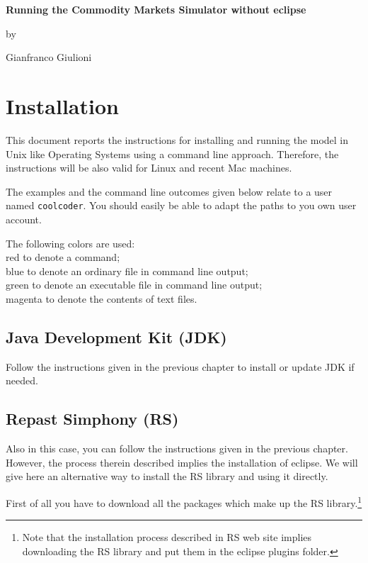 \documentclass{article}
\begin{document}
\begin{center}
	{\bf
	Running the Commodity Markets Simulator without eclipse
}

by

Gianfranco Giulioni
\end{center}




\section{Installation}
This document reports the instructions for installing and running the model in Unix like Operating Systems using a command line approach. Therefore, the instructions will be also valid for Linux and recent Mac machines.

The examples and the command line outcomes given below relate to a user named \verb+coolcoder+. You should easily be able to adapt the paths to you own user account. 

The following colors are used:\\
\color{red}red \color{black} to denote a command;\\
\color{blue}blue \color{black} to denote an ordinary file in command line output;\\
\color{green}green \color{black} to denote an executable file in command line output;\\
\color{magenta}magenta \color{black} to denote the contents of text files.\\

\subsection{Java Development Kit (JDK)}
Follow the instructions given in the previous chapter to install or update JDK if needed. 
\subsection{Repast Simphony (RS)}
Also in this case, you can follow the instructions given in the previous chapter. However, the process therein described implies the installation of eclipse. We will give here an alternative way to install the RS library and using it directly.

First of all you have to download all the packages which make up the RS library.\footnote{Note that the installation process described in RS web site implies downloading the RS library and put them in the eclipse plugins folder.}
\end{document}
